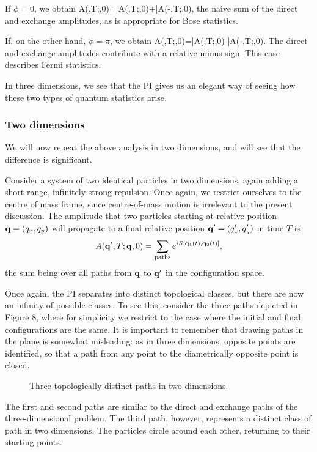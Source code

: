 \documentclass[12pt]{article}
\begin{document}
If $\phi=0$, we obtain
\beq
A(\bfq,T;\bfq,0)=\bar A(\bfq,T;\bfq,0)+\bar A(-\bfq,T;\bfq,0),
\label{stat3}
\eeq
the naive sum of the direct and exchange
amplitudes, as is appropriate for Bose statistics.

If, on the other hand, $\phi=\pi$, we obtain
\beq
A(\bfq,T;\bfq,0)=\bar A(\bfq,T;\bfq,0)-\bar A(-\bfq,T;\bfq,0).
\label{stat4}
\eeq
The direct and exchange amplitudes contribute with a relative minus
sign. This case describes Fermi statistics. 

In three dimensions, we see that the PI gives us an elegant way of
seeing how these two types of quantum statistics arise.

\subsubsection{Two dimensions}

We will now repeat the above analysis in two dimensions, and
will see that the difference is significant.

Consider a system of two identical particles in two dimensions, again
adding a short-range, infinitely strong repulsion.
Once again, we restrict
ourselves to the centre of mass frame, since centre-of-mass
motion is irrelevant to the present discussion.
The amplitude that two particles starting at relative position
${\mathbf q}=(q_x,q_y)$ will propagate to a final relative position
${\mathbf q}'=(q_x',q_y')$ in time $T$ is
\[ A({\mathbf q}',T;{\mathbf q},0)=\sum_{\mathrm{paths}}e^{iS[{\mathbf q}_1(t),{\mathbf q}_2(t)]},
\]
the sum being over all paths from ${\mathbf q}$ to ${\mathbf q}'$ in the
configuration space. 

Once again, the PI separates into distinct topological classes, but
there are now an infinity of possible classes. To see this, consider
the three paths depicted in Figure 8,
where for simplicity we restrict to the
case where the initial and final configurations are the same. It
is important to remember that drawing paths in the plane is somewhat
misleading: as in three dimensions, 
opposite points are identified, so that a path
from any point to the diametrically opposite point is closed.

\begin{figure}[hb]
\epsfysize=5cm
\centerline{}
\caption{Three topologically distinct paths in two dimensions.}
\end{figure}


The first and second paths are similar to the direct and exchange
paths of the three-dimensional problem. The third path, however,
represents a distinct class of path in two dimensions. The particles
circle around each other, returning to their starting points.
\end{document}
